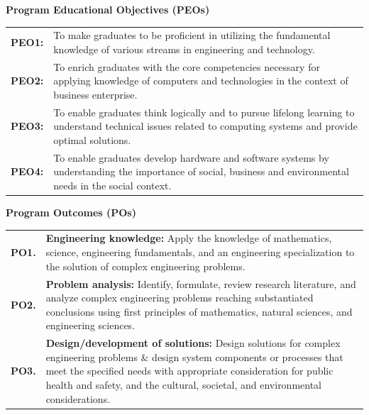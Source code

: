 \thispagestyle{empty}
\begin{center}
  {\fontsize{16pt}{20pt}\selectfont\bfseries Program Educational Objectives (PEOs)\par}
\end{center}
\vspace{0.3cm}

\begin{table}[H]
  \centering
  \fontsize{13pt}{18pt}\selectfont
  \begin{tabularx}{\textwidth}{@{}p{2.2cm} L@{}}
    \textbf{PEO1:} & To make graduates to be proficient in utilizing the fundamental knowledge of various streams in engineering and technology. \\[6pt]
    \textbf{PEO2:} & To enrich graduates with the core competencies necessary for applying knowledge of computers and technologies in the context of business enterprise. \\[6pt]
    \textbf{PEO3:} & To enable graduates think logically and to pursue lifelong learning to understand technical issues related to computing systems and provide optimal solutions. \\[6pt]
    \textbf{PEO4:} & To enable graduates develop hardware and software systems by understanding the importance of social, business and environmental needs in the social context.
  \end{tabularx}
\end{table}

\vspace{0.4cm}
\begin{center}
  {\fontsize{16pt}{20pt}\selectfont\bfseries Program Outcomes (POs)\par}
\end{center}
\vspace{0.2cm}

\begin{table}[H]
  \centering
  \fontsize{13pt}{18pt}\selectfont
  \begin{tabularx}{\textwidth}{@{}p{1.8cm} L@{}}
    \textbf{PO1.} & \textbf{Engineering knowledge:} Apply the knowledge of mathematics, science, engineering fundamentals, and an engineering specialization to the solution of complex engineering problems. \\[6pt]
    \textbf{PO2.} & \textbf{Problem analysis:} Identify, formulate, review research literature, and analyze complex engineering problems reaching substantiated conclusions using first principles of mathematics, natural sciences, and engineering sciences. \\[6pt]
    \textbf{PO3.} & \textbf{Design/development of solutions:} Design solutions for complex engineering problems \& design system components or processes that meet the specified needs with appropriate consideration for public health and safety, and the cultural, societal, and environmental considerations.
  \end{tabularx}
\end{table}
\newpage

